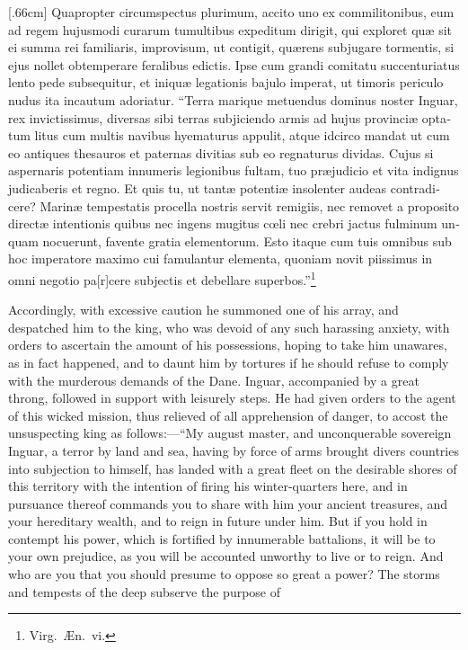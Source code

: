 \documentclass[10pt]{book}
\begin{document}
\begin{paracol}{2}

\begin{otherlanguage}{latin}
[.66cm]
Quapropter circumspectus plurimum, accito uno ex commilitonibus, eum ad regem hujusmodi curarum tumultibus expeditum dirigit, qui exploret qu\ae{} sit ei summa rei familiaris, improvisum, ut contigit, qu\ae{}rens subjugare tormentis, si ejus nollet obtemperare feralibus edictis. Ipse cum grandi comitatu succenturiatus lento pede subsequitur, et iniqu\ae{} legationis bajulo imperat, ut timoris periculo nudus ita incautum adoriatur. ``Terra marique metuendus dominus noster Inguar, rex invictissimus, diversas sibi terras subjiciendo armis ad hujus provinci\ae{} optatum litus cum multis navibus hyematurus appulit, atque idcirco mandat ut cum eo antiques thesauros et paternas divitias sub eo regnaturus dividas. Cujus si aspernaris potentiam innumeris legionibus fultam, tuo pr\ae{}judicio et vita indignus judicaberis et regno. Et quis tu, ut tant\ae{} potenti\ae{} insolenter audeas contradicere? Marin\ae{} tempestatis procella nostris servit remigiis, nec removet a proposito direct\ae{} intentionis quibus nec ingens mugitus c\oe{}li nec crebri jactus fulminum unquam nocuerunt, favente gratia elementorum. Esto itaque cum tuis omnibus sub hoc imperatore maximo cui famulantur elementa, quoniam novit piissimus in omni negotio pa[r]cere subjectis et debellare superbos.''\footnote[\textdagger]{Virg.\ \AE{}n.\ vi.}
\end{otherlanguage}

\switchcolumn

Accordingly, with excessive caution he summoned one of his array, and despatched him to the king, who was devoid of any such harassing anxiety, with orders to ascertain the amount of his possessions, hoping to take him unawares, as in fact happened, and to daunt him by tortures if he should refuse to comply with the murderous demands of the Dane. Inguar, accompanied by a great throng, followed in support with leisurely steps. He had given orders to the agent of this wicked mission, thus relieved of all apprehension of danger, to accost the unsuspecting king as follows:---``My august master, and unconquerable sovereign Inguar, a terror by land and sea, having by force of arms brought divers countries into subjection to himself, has landed with a great fleet on the desirable shores of this territory with the intention of firing his winter-quarters here, and in pursuance thereof commands you to share with him your ancient treasures, and your hereditary wealth, and to reign in future under him. But if you hold in contempt his power, which is fortified by innumerable battalions, it will be to your own prejudice, as you will be accounted unworthy to live or to reign. And who are you that you should presume to oppose so great a power? The storms and tempests of the deep subserve the purpose of\linebreak{} 

\end{paracol}
\end{document}
